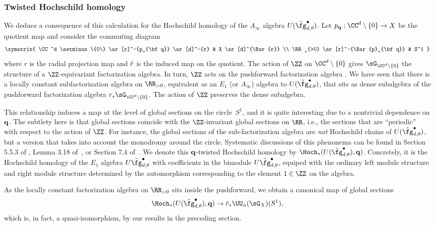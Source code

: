 \subsubsection{Twisted Hochschild homology}

We deduce a consequence of this calculation for the Hochschild homology of the $A_\infty$ algebra $U(\Tilde{\fg}^\bullet_{d,\theta})$.
Let $p_{\bf q} :  \CC^d \setminus \{0\} \to X$ be the quotient map and consider the commuting diagram
\[
\xymatrix{
\CC^d \setminus \{0\} \ar[r]^-{p_{\bf q}} \ar[d]^-{r} & X \ar[d]^{\Bar{r}} \\
\RR_{>0} \ar[r]^-{\Bar{p}_{\bf q}} & S^1
}
\]
where $r$ is the radial projection map and $\Bar{r}$ is the induced map on the quotient.
The action of $\ZZ$ on $\CC^d \setminus\{0\}$ gives $\sG_{\CC^d \setminus \{0\}}$ the structure of a $\ZZ$-equivariant factorization algebra. 
In turn, $\ZZ$ acts on the pushforward factorization algebra .
We have seen that there is a locally constant subfactorization algebra on $\RR_{>0}$, equivalent as an $E_1$ (or $A_\infty$) algebra to $U(\Tilde{\fg}^\bullet_{d,\theta})$, that sits as dense subalgebra of the pushforward factorization algebra $r_* \sG_{\CC^d \setminus \{0\}}$.
The action of $\ZZ$ preserves the dense subalgebra.

This relationship induces a map at the level of global sections on the circle~$S^1$,
and it is quite interesting due to a nontrivial dependence on ${\bf q}$.
The subtlety here is that global sections coincide with the $\ZZ$-invariant global sections on $\RR$, 
i.e., the sections that are ``periodic'' with respect to the action of $\ZZ$.
For instance, the global sections of the sub-factorization algebra are {\em not} Hochschild chains of $U(\Tilde{\fg}^\bullet_{d,\theta})$, 
but a version that takes into account the monodromy around the circle.
Systematic discussions of this phenonema can be found in Section 5.5.3 of \cite{LurieHA}, Lemma 3.18 of~\cite{AFTopMan}, or Section 7.4 of~\cite{CG1}.
We denote this ${\bf q}$-twisted Hochschild homology by $\Hoch_*(U(\Tilde{\fg}^\bullet_{d,\theta}), {\bf q})$.
Concretely, it is the Hochschild homology of the $E_1$ algebra $U \Tilde{\fg}_{d,\theta}^\bullet$ with coefficients in the bimodule $U \Tilde{\fg}_{d, \theta}^\bullet$, equiped with the ordinary left module structure and right module structure determined by the automorphism corresponding to the element $1 \in \ZZ$ on the algebra.

As the locally constant factorization algebra on $\RR_{>0}$ sits inside the pushforward, 
we obtain a canonical map of global sections
\[
\Hoch_*(U(\Tilde{\fg}^\bullet_{d,\theta}), {\bf q}) \to \Bar{r}_* \UU_\alpha(\sG_X) (S^1) ,
\]
which is, in fact, a quasi-isomorphism, by our results in the preceding section. 

